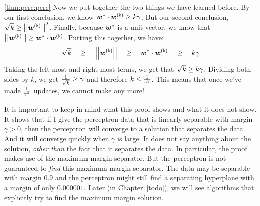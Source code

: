 \documentclass[trans]{beamer}
\begin{document}
\begin{myproof}{\ref{thm:perc:perc}}
  Now we put together the two things we have learned before.  By our
  first conclusion, we know $\dotp{\vw^*}{\vw\kth} \geq k \ga$.  But
  our second conclusion, $\sqrt{k} \geq \norm{\vw\kth}^2$.  Finally,
  because ${\boldsymbol{w}}^*$ is a unit vector, we know that $\norm{\vw\kth} \geq
  \dotp{\vw^*}{\vw\kth}$.  Putting this together, we have:
  \begin{equation}
    \sqrt k 
    \quad\geq\quad
    \norm{\vw\kth}
    \quad\geq\quad
    \dotp{\vw^*}{\vw\kth}
    \quad\geq\quad
    k\ga
  \end{equation}
  Taking the left-most and right-most terms, we get that $\sqrt{k}
  \geq k \gamma$.  Dividing both sides by $k$, we get $\frac 1 {\sqrt{k}}
  \geq \gamma$ and therefore $k \leq \frac 1 {\gamma^2}$.  This means
  that once we've made $\frac 1 {\gamma^2}$ updates, we cannot make
  any more!
\end{myproof}



It is important to keep in mind what this proof shows and what it does
not show.  It shows that if I give the perceptron data that is
linearly separable with margin $\gamma > 0$, then the perceptron will
converge to a solution that separates the data.  And it will converge
quickly when $\gamma$ is large.  It does not say anything about the
solution, \emph{other than} the fact that it separates the data.  In
particular, the proof makes use of the maximum margin separator.  But
the perceptron is not guaranteed to \emph{find} this maximum margin
separator.  The data may be separable with margin $0.9$ and the
perceptron might still find a separating hyperplane with a margin of
only $0.000001$.  Later (in Chapter~\ref{todo}), we will see
algorithms that explicitly try to find the maximum margin solution.
\end{document}
